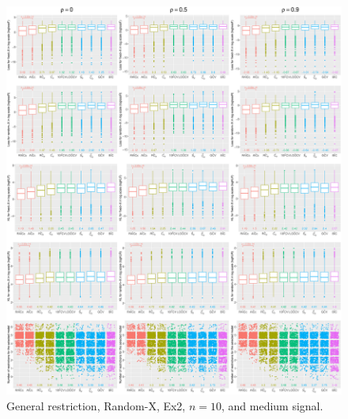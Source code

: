 \clearpage
\begin{figure}[!ht]
\centering
\includegraphics[width=\textwidth]{figures/supplement/randomx/general_restriction/Ex2_n10_msnr.eps}
\caption{General restriction, Random-X, Ex2, $n=10$, and medium signal.}
\end{figure}
\clearpage

